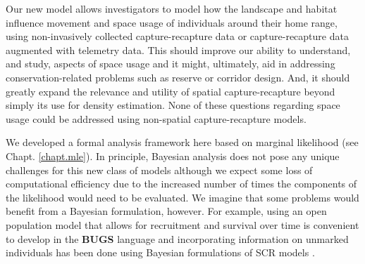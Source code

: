 Our new model allows investigators to model how the landscape and
habitat influence movement and space usage of individuals around their
home range, using non-invasively collected capture-recapture data or
capture-recapture data augmented with telemetry data.  This should
improve our ability to understand, and study, aspects of space usage
and it might, ultimately, aid in addressing conservation-related
problems such as reserve or corridor design. And, it should greatly
expand the relevance and utility of spatial capture-recapture beyond
simply its use for density estimation. None of these questions
regarding space usage could be addressed using non-spatial
capture-recapture models.

We developed a formal analysis framework here based on marginal
likelihood \citep{borchers_efford:2008} (see Chapt. \ref{chapt.mle}).
In principle, Bayesian analysis does not pose any unique challenges
for this new class of models although we expect some loss of
computational efficiency due to the increased number of times the
components of the likelihood would need to be evaluated.  We imagine
that some problems would benefit from a Bayesian formulation,
however. For example, using an open population model that allows for
recruitment and survival over time \citep{gardner_etal:2010} is
convenient to develop in the {\bf BUGS} language and incorporating
information on unmarked individuals has been done using Bayesian
formulations of SCR models \citep{chandler_royle:2012,
  sollmann_etal:2012}.

